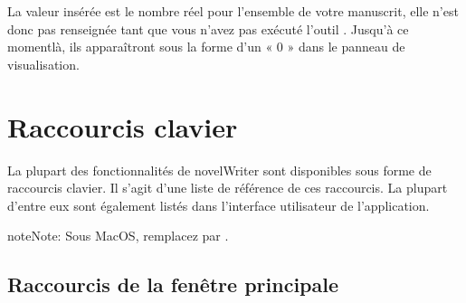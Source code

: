 \documentclass[a4paper,11pt,french]{sphinxmanual}
\begin{document}
\sphinxAtStartPar
La valeur insérée est le nombre réel pour l’ensemble de votre manuscrit, elle n’est donc pas renseignée tant que vous n’avez pas exécuté l’outil . Jusqu’à ce moment\sphinxhyphen{}là, ils apparaîtront sous la forme d’un « 0 » dans le panneau de visualisation.

\sphinxstepscope


\chapter{Raccourcis clavier}
\label{\detokenize{usage_shortcuts:keyboard-shortcuts}}\label{\detokenize{usage_shortcuts:a-kb}}\label{\detokenize{usage_shortcuts::doc}}
\sphinxAtStartPar
La plupart des fonctionnalités de novelWriter sont disponibles sous forme de raccourcis clavier. Il s’agit d’une liste de référence de ces raccourcis. La plupart d’entre eux sont également listés dans l’interface utilisateur de l’application.

\begin{sphinxadmonition}{note}{Note:}
\sphinxAtStartPar
Sous MacOS, remplacez  par .
\end{sphinxadmonition}


\section{Raccourcis de la fenêtre principale}
\label{\detokenize{usage_shortcuts:main-window-shortcuts}}\label{\detokenize{usage_shortcuts:a-kb-main}}
\end{document}
